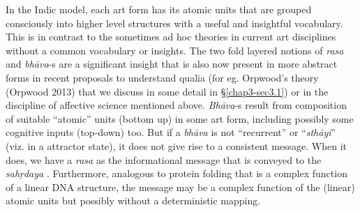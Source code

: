 In the Indic model, each art form has its atomic units that are grouped consciously into higher level structures with a useful and insightful vocabulary. This is in contrast to the sometimes ad hoc theories in current art disciplines without a common vocabulary or insights. The two fold layered notions of \textsl{rasa} and \textsl{bhāva}-s are a significant insight that is also now present in more abstract forms in recent proposals to understand qualia (for eg. Orpwood’s theory (Orpwood 2013) that we discuss in some detail in \S\ref{chap3-sec3.1}) or in the discipline of affective science mentioned above. \textsl{Bhāva}-s result from composition of suitable “atomic” units (bottom up) in some art form, including possibly some cognitive inputs (top-down) too. But if a \textsl{bhāva} is not “recurrent” or “\textsl{sthāyi}” (viz. in a attractor state), it does not give rise to a consistent message. When it does, we have a \textsl{rasa} as the informational message that is conveyed to the \textsl{sahṛdaya}
. Furthermore, analogous to protein folding that is a complex function of a linear DNA structure, the message may be a complex function of the (linear) atomic units but possibly without a deterministic mapping.

